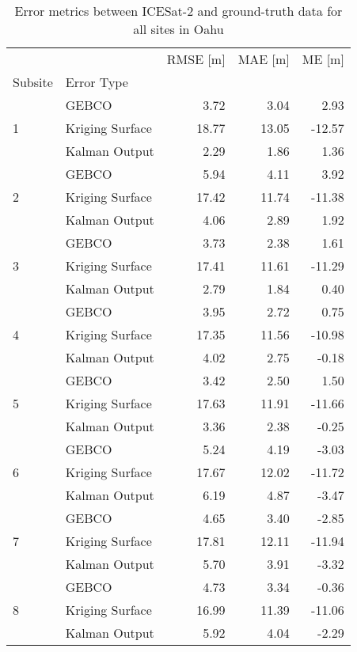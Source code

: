 \begin{table}[!ht]
\centering
\caption{Error metrics between ICESat-2 and ground-truth data for all sites in Oahu}
\label{tab:appendix_oahu_raster_error}
\begin{tabular}{llrrr}
\toprule
 &  & RMSE [m] & MAE [m] & ME [m] \\
Subsite & Error Type &  &  &  \\
\midrule
\multirow[c]{3}{*}{1} & GEBCO & 3.72 & 3.04 & 2.93 \\
 & Kriging Surface & 18.77 & 13.05 & -12.57 \\
 & Kalman Output & 2.29 & 1.86 & 1.36 \\
\cline{1-2}
\multirow[c]{3}{*}{2} & GEBCO & 5.94 & 4.11 & 3.92 \\
 & Kriging Surface & 17.42 & 11.74 & -11.38 \\
 & Kalman Output & 4.06 & 2.89 & 1.92 \\
\cline{1-2}
\multirow[c]{3}{*}{3} & GEBCO & 3.73 & 2.38 & 1.61 \\
 & Kriging Surface & 17.41 & 11.61 & -11.29 \\
 & Kalman Output & 2.79 & 1.84 & 0.40 \\
\cline{1-2}
\multirow[c]{3}{*}{4} & GEBCO & 3.95 & 2.72 & 0.75 \\
 & Kriging Surface & 17.35 & 11.56 & -10.98 \\
 & Kalman Output & 4.02 & 2.75 & -0.18 \\
\cline{1-2}
\multirow[c]{3}{*}{5} & GEBCO & 3.42 & 2.50 & 1.50 \\
 & Kriging Surface & 17.63 & 11.91 & -11.66 \\
 & Kalman Output & 3.36 & 2.38 & -0.25 \\
\cline{1-2}
\multirow[c]{3}{*}{6} & GEBCO & 5.24 & 4.19 & -3.03 \\
 & Kriging Surface & 17.67 & 12.02 & -11.72 \\
 & Kalman Output & 6.19 & 4.87 & -3.47 \\
\cline{1-2}
\multirow[c]{3}{*}{7} & GEBCO & 4.65 & 3.40 & -2.85 \\
 & Kriging Surface & 17.81 & 12.11 & -11.94 \\
 & Kalman Output & 5.70 & 3.91 & -3.32 \\
\cline{1-2}
\multirow[c]{3}{*}{8} & GEBCO & 4.73 & 3.34 & -0.36 \\
 & Kriging Surface & 16.99 & 11.39 & -11.06 \\
 & Kalman Output & 5.92 & 4.04 & -2.29 \\
\cline{1-2}
\bottomrule
\end{tabular}
\end{table}
